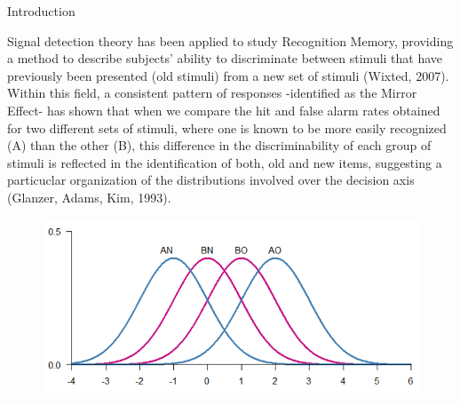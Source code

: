 \documentclass[final]{beamer}
\newlength{\onecolwid}
\begin{document}
\begin{frame}[t]
\begin{columns}[t]
\begin{column}{\onecolwid}



\begin{alertblock}{Introduction}

Signal detection theory has been applied to study Recognition Memory, providing a method to describe subjects’ ability to discriminate between stimuli that have previously been presented (old stimuli) from a new set of stimuli (Wixted, 2007). Within this field, a consistent pattern of responses -identified as the Mirror Effect- has shown that when we compare the hit and false alarm rates obtained for two different sets of stimuli, where one is known to be more easily recognized (A) than the other (B), this difference in the discriminability of each group of stimuli is reflected in the identification of both, old and new items, suggesting a particuclar organization of the distributions involved over the decision axis (Glanzer, Adams, Kim, 1993). 



\begin{figure}
\includegraphics[width=0.6\linewidth]{Figures/MirrorEffect.png}
\end{figure}





\end{alertblock}
\end{column}
\end{columns}
\end{frame}
\end{document}
